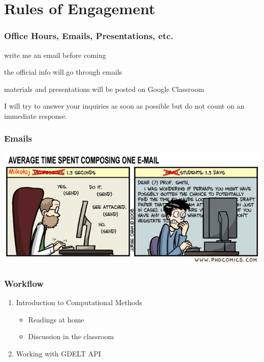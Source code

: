 \documentclass[aspectratio=169]{beamer}
\begin{document}
\section{Rules of Engagement}

\begin{frame}
    \frametitle{Office Hours, Emails, Presentations, etc.}
    \begin{description}
        \item [Office Hours:] write me an email before coming
        \item [Emails:] the official info will go through emails
        \item [Google Classroom:] materials and presentations will be posted on
        Google Classroom
    \end{description}
    \alert{I will try to answer your inquiries as soon as possible but do not
    count on an immediate response.}
\end{frame}
\begin{frame}
    \frametitle{Emails}
        \includegraphics[width = \textwidth]{emails.png}
\end{frame}
\begin{frame}
    \frametitle{Workflow}
    \begin{enumerate}
        \item Introduction to Computational Methods
        \begin{itemize}
            \item Readings at home
            \item Discussion in the classroom
        \end{itemize}
        \item Working with GDELT API
    \end{enumerate}
\end{frame}
\end{document}
